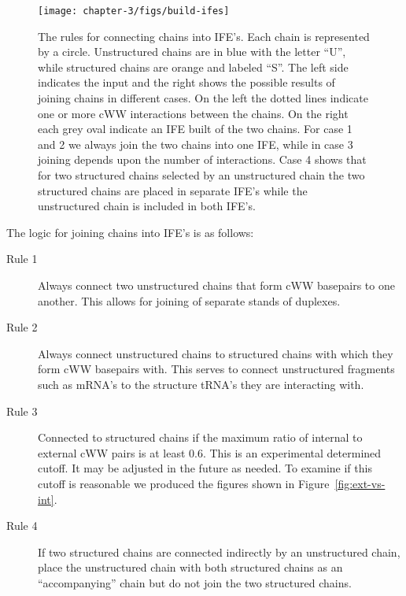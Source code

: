 \begin{figure}
  \texttt{[image: chapter-3/figs/build-ifes]}
  \caption{The rules for connecting chains into IFE's. Each chain is
    represented by a circle. Unstructured chains are in blue with the letter
    ``U'', while structured chains are orange and labeled ``S''. The left side
    indicates the input and the right shows the possible results of joining
    chains in different cases. On the left the dotted lines indicate one or more
    cWW interactions between the chains. On the right each grey oval indicate
    an IFE built of the two chains. For case 1 and 2 we always join the two
    chains into one IFE, while in case 3 joining depends upon the number of
    interactions. Case 4 shows that for two structured chains selected by an
    unstructured chain the two structured chains are placed in separate IFE's
    while the unstructured chain is included in both IFE's.}
  \label{fig:build-ife}
\end{figure}

The logic for joining chains into IFE's is as follows:

\begin{description}
  \item[Rule 1] Always connect two unstructured chains that form cWW basepairs
    to one another. This
    allows for joining of separate stands of duplexes.

  \item[Rule 2] Always connect unstructured chains to structured chains with
    which they form cWW basepairs with. This serves to connect unstructured
    fragments such as mRNA's to the structure tRNA's they are interacting with.

  \item[Rule 3] Connected to structured chains if the maximum ratio of internal
    to external cWW pairs is at least 0.6. This is an experimental determined
    cutoff. It may be adjusted in the future as needed. To examine if this
    cutoff is reasonable we produced the figures shown in
    Figure~\ref{fig:ext-vs-int}.

  \item[Rule 4] If two structured chains are connected indirectly by an
    unstructured chain, place the unstructured chain with both structured chains
    as an ``accompanying'' chain but do not join the two structured chains.
\end{description}

